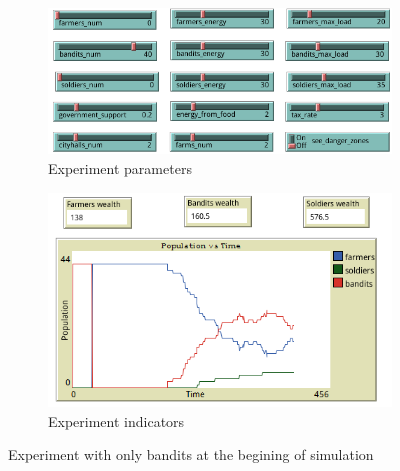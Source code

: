 \documentclass{wscpaperproc}
\begin{document}
\begin{figure}[h!]
    \begin{subfigure}{0.45\textwidth}
    \includegraphics[width=\textwidth]{Images/Exp3_sliders.png}
    \caption{Experiment parameters}
    \end{subfigure}
    \hfill
    \begin{subfigure}{0.45\textwidth}
    \includegraphics[width=\textwidth]{Images/Exp3_indicators.png}
    \caption{Experiment indicators}
    \end{subfigure}%
    \caption{Experiment with only bandits at the begining of simulation}
    \label{bandits_only}
\end{figure}
\end{document}
